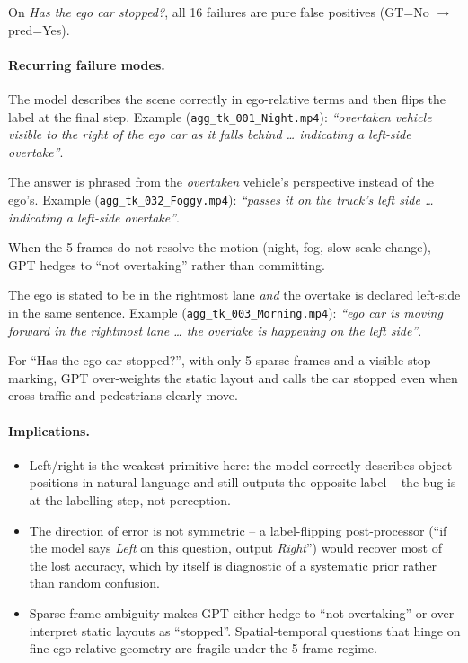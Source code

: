 \documentclass[11pt,a4paper]{article}
\newcommand{\code}[1]{\texttt{#1}}
\begin{document}
On \emph{Has the ego car stopped?}, all 16 failures are pure false
positives (GT=No $\to$ pred=Yes).

\paragraph{Recurring failure modes.}
\begin{description}[style=nextline]
  \item[Dashcam/egocentric left--right inversion (dominant, $\sim$60
  of 86).] The model describes the scene correctly in ego-relative
  terms and then flips the label at the final step. Example
  (\code{agg\_tk\_001\_Night.mp4}): \emph{``overtaken vehicle visible
  to the right of the ego car as it falls behind \ldots{} indicating
  a left-side overtake''}.
  \item[Reference-frame swap.] The answer is phrased from the
  \emph{overtaken} vehicle's perspective instead of the ego's.
  Example (\code{agg\_tk\_032\_Foggy.mp4}): \emph{``passes it on the
  truck's left side \ldots{} indicating a left-side overtake''}.
  \item[Refusal / ``not overtaking''.] When the 5 frames do not
  resolve the motion (night, fog, slow scale change), GPT hedges to
  ``not overtaking'' rather than committing.
  \item[Lane-of-ego confusion.] The ego is stated to be in the
  rightmost lane \emph{and} the overtake is declared left-side in
  the same sentence. Example (\code{agg\_tk\_003\_Morning.mp4}):
  \emph{``ego car is moving forward in the rightmost lane \ldots{}
  the overtake is happening on the left side''}.
  \item[False-stationary from static layout.] For ``Has the ego car
  stopped?'', with only 5 sparse frames and a visible stop marking,
  GPT over-weights the static layout and calls the car stopped even
  when cross-traffic and pedestrians clearly move.
\end{description}

\paragraph{Implications.}
\begin{itemize}
  \item Left/right is the weakest primitive here: the model correctly
  describes object positions in natural language and still outputs the
  opposite label -- the bug is at the labelling step, not perception.
  \item The direction of error is not symmetric -- a
  label-flipping post-processor (``if the model says \emph{Left} on
  this question, output \emph{Right}'') would recover most of the
  lost accuracy, which by itself is diagnostic of a systematic prior
  rather than random confusion.
  \item Sparse-frame ambiguity makes GPT either hedge to ``not
  overtaking'' or over-interpret static layouts as ``stopped''.
  Spatial-temporal questions that hinge on fine ego-relative geometry
  are fragile under the 5-frame regime.
\end{itemize}
\end{document}

